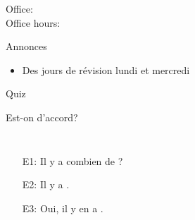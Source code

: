 \documentclass{beamer}
\subtitle[Les quantités]{Les quantités}
\begin{document}
  \begin{frame}
    \titlepage
    \tiny{Office: \\
          Office hours: }
  \end{frame}

  \begin{frame}{Annonces}
    \begin{itemize}
      \item Des jours de révision lundi et mercredi
      \item[] 
    \end{itemize}
  \end{frame}

  \begin{frame}{}
    \begin{center}
      \Large Quiz
    \end{center}
  \end{frame}

  \begin{frame}{Est-on d'accord?}
    \begin{columns}
        \begin{itemize}
          \item[E1:] Il y a combien de \underline{}?
          \item[E2:] Il y a \underline{}.
          \item[E3:] Oui, il y en a \underline{}.
        \end{itemize}
        \begin{minipage}[c][0.6\textheight]{\linewidth}
          \begin{center}
          \end{center}
        \end{minipage}
    \end{columns}
  \end{frame}
\end{document}
